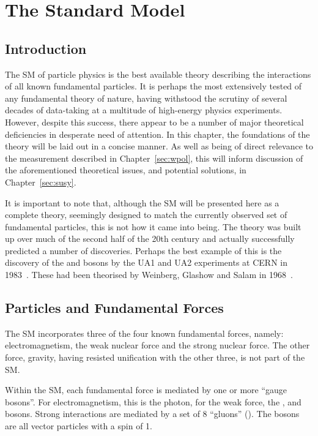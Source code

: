 \chapter{The Standard Model}
\label{sec:sm}
\section{Introduction}
The \acl{SM} of particle physics is the best available theory describing the
interactions of all known fundamental particles. It is perhaps the most
extensively tested of any fundamental theory of nature, having withstood the
scrutiny of several decades of data-taking at a multitude of high-energy physics
experiments. However, despite this success, there appear to be a number of major
theoretical deficiencies in desperate need of attention. In this chapter, the
foundations of the theory will be laid out in a concise manner. As well as being
of direct relevance to the measurement described in Chapter~\ref{sec:wpol}, this
will inform discussion of the aforementioned theoretical issues, and potential
solutions, in Chapter~\ref{sec:susy}.

It is important to note that, although the \ac{SM} will be presented here as a
complete theory, seemingly designed to match the currently observed set of
fundamental particles, this is not how it came into being. The theory was built
up over much of the second half of the 20th century and actually successfully
predicted a number of discoveries. Perhaps the best example of this is the
discovery of the \PW and \PZ bosons by the UA1 and UA2 experiments at \ac{CERN}
in 1983~\cite{ua1_w, ua1_z}. These had been theorised by Weinberg,
Glashow and Salam in 1968~\cite{weinberg,glashow,salam}.

\section{Particles and Fundamental Forces}
\label{sec:theory:particles}
The \ac{SM} incorporates three of the four known fundamental forces, namely:
electromagnetism, the weak nuclear force and the strong nuclear force. The other
force, gravity, having resisted unification with the other three, is not part of
the \ac{SM}.

Within the \ac{SM}, each fundamental force is mediated by one or more ``gauge
bosons''. For electromagnetism, this is the photon, for the weak force, the
\PWp, \PWm and \PZ bosons. Strong interactions are mediated by a set of 8
``gluons'' (\Pg). The bosons are all vector particles with a spin of 1.


